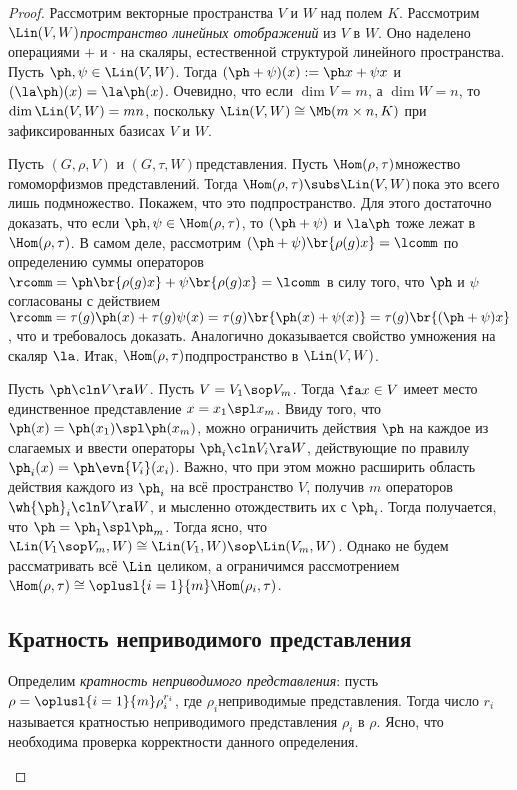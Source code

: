 \documentclass[a4paper]{article}
\begin{document}
\begin{proof}
Рассмотрим векторные пространства $V$ и $W$ над полем $K$. Рассмотрим
$\Lin(V, W)$\т \emph{пространство линейных отображений} из $V$
в $W$. Оно наделено операциями $+$ и $\cdot$ на скаляры, 
естественной структурой линейного пространства. Пусть $\ph, \psi
\in \Lin(V,W)$. Тогда $(\ph + \psi)(x):=\ph x+\psi x$ и
$(\la\ph)(x)=\la\ph(x)$. Очевидно, что если $\dim V = m$, а $\dim
W=n$, то $\dim \Lin(V,W) = mn$, поскольку $\Lin(V,W) \cong
\Mb(m\times n, K)$ при зафиксированных базисах $V$ и $W$.

Пусть $(G, \rho, V)$ и $(G, \tau, W)$\т представления. Пусть
$\Hom(\rho,\tau)$\т множество гомоморфизмов представлений. Тогда
$\Hom(\rho, \tau) \subs \Lin(V,W)$\т пока это всего лишь
подмножество. Покажем, что это подпространство. Для этого
достаточно доказать, что если $\ph, \psi \in \Hom(\rho, \tau)$, то
$(\ph + \psi)$ и $\la \ph$ тоже лежат в $\Hom(\rho,\tau)$. В самом
деле, рассмотрим $(\ph + \psi)\br{\rho(g)x}=\lcomm$ по определению
суммы операторов $\rcomm =\ph\br{\rho(g)x} +
\psi\br{\rho(g)x}=\lcomm$ в силу того, что $\ph$ и $\psi$
согласованы с действием $\rcomm = \tau(g)\ph(x) + \tau(g)\psi(x) =
\tau(g)\br{\ph(x)+\psi(x)}=\tau(g)\br{(\ph+\psi)x}$, что и
требовалось доказать. Аналогично доказывается свойство умножения
на скаляр $\la$. Итак, $\Hom(\rho,\tau)$\т подпространство в
$\Lin(V, W)$.

Пусть $\ph\cln V \ra W$. Пусть $V = V_1 \sop V_m$. Тогда $\fa x \in V$
имеет место единственное представление $x = x_1 \spl x_m$. Ввиду
того, что $\ph(x) = \ph(x_1) \spl \ph(x_m)$, можно ограничить
действия $\ph$ на каждое из слагаемых и ввести операторы $\ph_i\cln
V_i \ra W$, действующие по правилу $\ph_i(x) =
\ph\evn{V_i}(x_i)$. Важно, что при этом можно расширить область
действия каждого из $\ph_i$ на всё пространство $V$, получив $m$
операторов $\wh{\ph}_i\cln V\ra W$, и мысленно отождествить их с
$\ph_i$. Тогда получается, что $\ph = \ph_1 \spl \ph_m$. Тогда
ясно, что $\Lin(V_1 \sop V_m, W) \cong \Lin(V_1,W) \sop
\Lin(V_m,W)$. Однако не будем рассматривать всё $\Lin$ целиком, а
ограничимся рассмотрением
$\Hom(\rho,\tau)\cong\oplusl{i=1}{m}\Hom(\rho_i,\tau)$.

\subsection{Кратность неприводимого представления}

\begin{df}
Определим \emph{кратность неприводимого представления}: пусть $\rho
=\oplusl{i=1}{m}\rho_i^{r_i}$, где
$\rho_i$\т неприводимые представления. Тогда число $r_i$ называется кратностью неприводимого представления
$\rho_i$ в $\rho$. Ясно, что необходима проверка корректности данного определения.
\end{df}


\end{proof}
\end{document}
